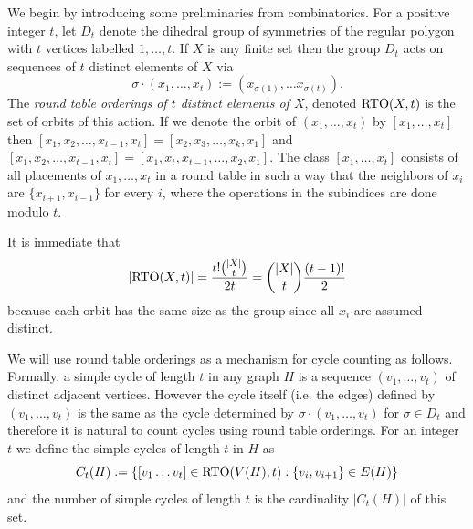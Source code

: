 \documentclass[12pt]{amsart}
\theoremstyle{definition}
\newcommand{\1}{\ensuremath{\mathbb{1}}}
\begin{document}
We begin by introducing some preliminaries from combinatorics. For a positive integer $t$, let $D_t$ denote the dihedral group of symmetries of the regular polygon with $t$ vertices labelled $1,\dots, t$. If $X$ is any finite set then the group $D_t$ acts on sequences of $t$ distinct elements of $X$ via 
\[\sigma\cdot(x_1,\dots, x_t):=(x_{\sigma(1)},\dots x_{\sigma(t)}).\]
The \emph{round table orderings of $t$ distinct elements of $X$}, denoted ${\rm RTO}(X,t)$ is the set of orbits of this action. If we denote the orbit of $(x_1,\dots, x_t)$ by $[x_1,\dots, x_t]$ then $[x_1,x_2,\dots,x_{t-1}, x_t] = [x_2,x_3,\dots, x_k,x_1]$ and $[x_1,x_2,\dots,x_{t-1},x_t]=[x_1,x_t,x_{t-1},\dots, x_2,x_1]$. The class $[x_1,\dots, x_t]$ consists of all placements of $x_1,\dots, x_t$ in a round table in such a way that the neighbors of $x_i$ are $\{x_{i+1},x_{i-1}\}$ for every $i$, where the operations in the subindices are done modulo $t$.


It is immediate that
\[\left|{\rm RTO}(X,t)\right| = \frac{t!\binom{|X|}{t}}{2t}=\binom{|X|}{t}\frac{(t-1)!}{2} \]
because each orbit has the same size as the group since all $x_i$ are assumed distinct.

We will use round table orderings as a mechanism for cycle counting as follows. Formally, a simple cycle of length $t$ in any graph $H$ is a sequence $(v_1,\dots, v_t)$ of distinct adjacent vertices. However the cycle itself (i.e. the edges) defined by $(v_1,\dots, v_t)$ is the same as the cycle determined by $\sigma\cdot(v_1,\dots, v_t)$ for $\sigma\in D_t$ and therefore it is natural to count cycles using round table orderings. For an integer $t$ we define the simple cycles of length $t$ in $H$ as
\[C_t(H):=\left\{[v_1\dots v_t]\in {\rm RTO}(V(H),t): \{v_i,v_{i+1}\}\in E(H)\right\}\]
and the number of simple cycles of length $t$ is the cardinality $|C_t(H)|$ of this set.
\end{document}
